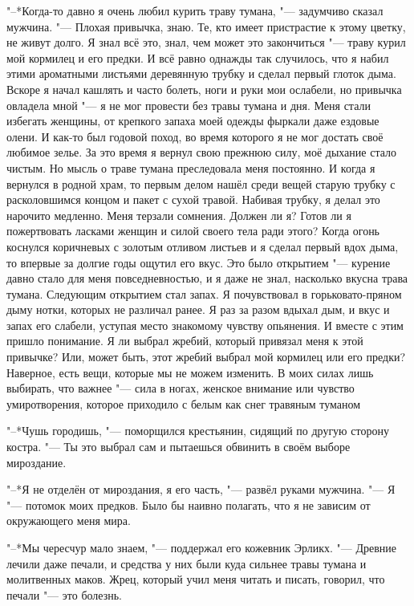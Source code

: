 "--*Когда-то давно я очень любил курить траву тумана, "--- задумчиво сказал мужчина.
"--- Плохая привычка, знаю.
Те, кто имеет пристрастие к этому цветку, не живут долго.
Я знал всё это, знал, чем может это закончиться "--- траву курил мой кормилец и его предки.
И всё равно однажды так случилось, что я набил этими ароматными листьями деревянную трубку и сделал первый глоток дыма.
Вскоре я начал кашлять и часто болеть, ноги и руки мои ослабели, но привычка овладела мной "--- я не мог провести без травы тумана и дня.
Меня стали избегать женщины, от крепкого запаха моей одежды фыркали даже ездовые олени.
И как-то был годовой поход, во время которого я не мог достать своё любимое зелье.
За это время я вернул свою прежнюю силу, моё дыхание стало чистым.
Но мысль о траве тумана преследовала меня постоянно.
И когда я вернулся в родной храм, то первым делом нашёл среди вещей старую трубку с расколовшимся концом и пакет с сухой травой.
Набивая трубку, я делал это нарочито медленно.
Меня терзали сомнения.
Должен ли я?
Готов ли я пожертвовать ласками женщин и силой своего тела ради этого?
Когда огонь коснулся коричневых с золотым отливом листьев и я сделал первый вдох дыма, то впервые за долгие годы ощутил его вкус.
Это было открытием "--- курение давно стало для меня повседневностью, и я даже не знал, насколько вкусна трава тумана.
Следующим открытием стал запах.
Я почувствовал в горьковато-пряном дыму нотки, которых не различал ранее.
Я раз за разом вдыхал дым, и вкус и запах его слабели, уступая место знакомому чувству опьянения.
И вместе с этим пришло понимание.
Я ли выбрал жребий, который привязал меня к этой привычке?
Или, может быть, этот жребий выбрал мой кормилец или его предки?
Наверное, есть вещи, которые мы не можем изменить.
В моих силах лишь выбирать, что важнее "--- сила в ногах, женское внимание или чувство умиротворения, которое приходило с белым как снег травяным туманом\ldotst

"--*Чушь городишь, "--- поморщился крестьянин, сидящий по другую сторону костра.
"--- Ты это выбрал сам и пытаешься обвинить в своём выборе мироздание.

"--*Я не отделён от мироздания, я его часть, "--- развёл руками мужчина.
"--- Я "--- потомок моих предков.
Было бы наивно полагать, что я не зависим от окружающего меня мира.

"--*Мы чересчур мало знаем, "--- поддержал его кожевник Эрликх.
"--- Древние лечили даже печали, и средства у них были куда сильнее травы тумана и молитвенных маков.
Жрец, который учил меня читать и писать, говорил, что печали "--- это болезнь.

